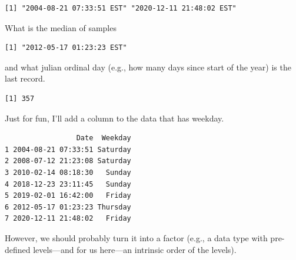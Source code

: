 \documentclass[
  letterpaper,
]{book}
\newenvironment{Shaded}{\begin{snugshade}}{\end{snugshade}}
\newcommand{\DecValTok}[1]{\textcolor[rgb]{0.68,0.00,0.00}{#1}}
\newcommand{\FunctionTok}[1]{\textcolor[rgb]{0.28,0.35,0.67}{#1}}
\newcommand{\NormalTok}[1]{\textcolor[rgb]{0.00,0.23,0.31}{#1}}
\newcommand{\OtherTok}[1]{\textcolor[rgb]{0.00,0.23,0.31}{#1}}
\newcommand{\SpecialCharTok}[1]{\textcolor[rgb]{0.37,0.37,0.37}{#1}}
\begin{document}
\begin{verbatim}
[1] "2004-08-21 07:33:51 EST" "2020-12-11 21:48:02 EST"
\end{verbatim}

What is the median of samples

\begin{Shaded}
\end{Shaded}

\begin{verbatim}
[1] "2012-05-17 01:23:23 EST"
\end{verbatim}

and what julian ordinal day (e.g., how many days since start of the
year) is the last record.

\begin{Shaded}
\end{Shaded}

\begin{verbatim}
[1] 357
\end{verbatim}

Just for fun, I'll add a column to the data that has weekday.

\begin{Shaded}
\end{Shaded}

\begin{verbatim}
                 Date  Weekday
1 2004-08-21 07:33:51 Saturday
2 2008-07-12 21:23:08 Saturday
3 2010-02-14 08:18:30   Sunday
4 2018-12-23 23:11:45   Sunday
5 2019-02-01 16:42:00   Friday
6 2012-05-17 01:23:23 Thursday
7 2020-12-11 21:48:02   Friday
\end{verbatim}

However, we should probably turn it into a factor (e.g., a data type
with pre-defined levels---and for us here---an intrinsic order of the
levels).
\end{document}
